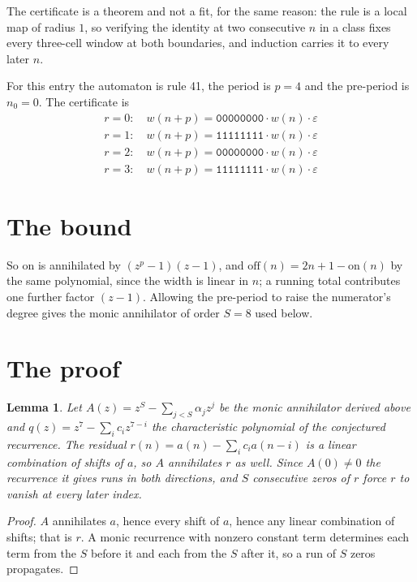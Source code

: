 \documentclass[11pt,a4paper]{article}
\theoremstyle{plain}
\newtheorem{lemma}[theorem]{Lemma}
\theoremstyle{definition}
\begin{document}
The certificate is a theorem and not a fit, for the same reason: the rule is a local map of
radius $1$, so verifying the identity at two consecutive $n$ in a class fixes every three-cell
window at both boundaries, and induction carries it to every later $n$.

For this entry the automaton is rule 41, the period is $p=4$ and the pre-period is $n_0=0$.
The certificate is
\begin{gather*}
r=0:\quad w(n+p) = \texttt{00000000} \cdot w(n) \cdot \varepsilon \\
r=1:\quad w(n+p) = \texttt{11111111} \cdot w(n) \cdot \varepsilon \\
r=2:\quad w(n+p) = \texttt{00000000} \cdot w(n) \cdot \varepsilon \\
r=3:\quad w(n+p) = \texttt{11111111} \cdot w(n) \cdot \varepsilon
\end{gather*}

\section{The bound}

So
$\mathrm{on}$ is annihilated by $(z^p-1)(z-1)$, and $\mathrm{off}(n)=2n+1-\mathrm{on}(n)$ by
the same polynomial, since the width is linear in $n$; a running total contributes one further
factor $(z-1)$. Allowing the pre-period to raise the numerator's degree gives the monic
annihilator of order $S=8$ used below.

\section{The proof}

\begin{lemma}\label{lem:crit}
Let $A(z)=z^S-\sum_{j<S}\alpha_jz^{j}$ be the monic annihilator derived above and
$q(z)=z^{7}-\sum_ic_iz^{7-i}$ the characteristic polynomial of the conjectured
recurrence. The residual $r(n)=a(n)-\sum_ic_ia(n-i)$ is a linear combination of shifts of $a$,
so $A$ annihilates $r$ as well. Since $A(0)\ne0$ the recurrence it gives runs in both
directions, and $S$ consecutive zeros of $r$ force $r$ to vanish at every later index.
\end{lemma}

\begin{proof}
$A$ annihilates $a$, hence every shift of $a$, hence any linear combination of shifts; that is
$r$. A monic recurrence with nonzero constant term determines each term from the $S$ before it
and each from the $S$ after it, so a run of $S$ zeros propagates.
\end{proof}
\end{document}
